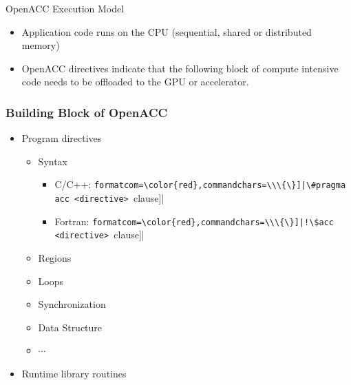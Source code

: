 \documentclass[c,mathserif,compress,xcolor=svgnames]{beamer}
\newcommand{\Verbred}[1]{\Verb[formatcom=\color{red},commandchars=\\\{\}]|#1|}
\newenvironment{eblock}[0]
{
\begin{beamerboxesrounded}[upper=uppercol2,lower=lowercol2,shadow=true]}
{\end{beamerboxesrounded}}
\begin{document}
\begin{frame}{\small OpenACC Execution Model}
  \begin{eblock}{}
    \begin{itemize}
      \item Application code runs on the CPU (sequential, shared or distributed memory)
      \item OpenACC directives indicate that the following block of compute intensive code needs to be offloaded to the GPU or accelerator.
    \end{itemize}
    \vspace{-0.5cm}
    
  \end{eblock}
\end{frame}

\begin{frame}[fragile]
  \frametitle{\small Building Block of OpenACC}
  \begin{eblock}{}
    \begin{itemize}
      \item Program directives
        \begin{itemize}
          \item Syntax
            \begin{itemize}
              \item C/C++: \Verbred{\#pragma acc <directive> [clause]}
              \item Fortran: \Verbred{!\$acc <directive> [clause]}
            \end{itemize}
          \item Regions
          \item Loops
          \item Synchronization
          \item Data Structure
          \item $\cdots$
        \end{itemize}
      \item Runtime library routines
    \end{itemize}
  \end{eblock}
\end{frame}
\end{document}
